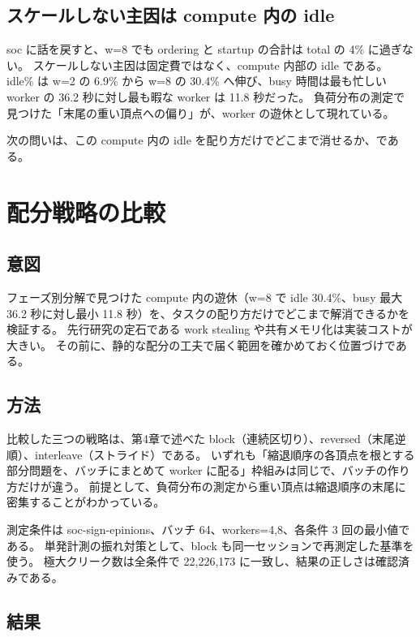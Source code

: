 \subsection{スケールしない主因は compute 内の idle}

soc に話を戻すと、w=8 でも ordering と startup の合計は total の 4\% に過ぎない。
スケールしない主因は固定費ではなく、compute 内部の idle である。
idle\% は w=2 の 6.9\% から w=8 の 30.4\% へ伸び、busy 時間は最も忙しい worker の 36.2 秒に対し最も暇な worker は 11.8 秒だった。
負荷分布の測定で見つけた「末尾の重い頂点への偏り」が、worker の遊休として現れている。

次の問いは、この compute 内の idle を配り方だけでどこまで消せるか、である。

\section{配分戦略の比較}
\label{sec:alloc}

\subsection{意図}

フェーズ別分解で見つけた compute 内の遊休（w=8 で idle 30.4\%、busy 最大 36.2 秒に対し最小 11.8 秒）を、タスクの配り方だけでどこまで解消できるかを検証する。
先行研究の定石である work stealing や共有メモリ化は実装コストが大きい。
その前に、静的な配分の工夫で届く範囲を確かめておく位置づけである。

\subsection{方法}

比較した三つの戦略は、第4章で述べた block（連続区切り）、reversed（末尾逆順）、interleave（ストライド）である。
いずれも「縮退順序の各頂点を根とする部分問題を、バッチにまとめて worker に配る」枠組みは同じで、バッチの作り方だけが違う。
前提として、負荷分布の測定から重い頂点は縮退順序の末尾に密集することがわかっている。

測定条件は soc-sign-epinions、バッチ 64、workers=4,8、各条件 3 回の最小値である。
単発計測の振れ対策として、block も同一セッションで再測定した基準を使う。
極大クリーク数は全条件で 22{,}226{,}173 に一致し、結果の正しさは確認済みである。

\subsection{結果}

